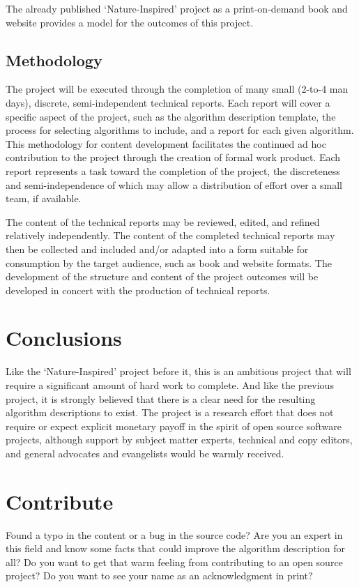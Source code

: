 \documentclass[a4paper, 11pt]{article}
\begin{document}
The already published `Nature-Inspired' project as a print-on-demand book and website provides a model for the outcomes of this project.

\subsection{Methodology}
The project will be executed through the completion of many small (2-to-4 man days), discrete, semi-independent technical reports. Each report will cover a specific aspect of the project, such as the algorithm description template, the process for selecting algorithms to include, and a report for each given algorithm. This methodology for content development facilitates the continued ad hoc contribution to the project through the creation of formal work product. Each report represents a task toward the completion of the project, the discreteness and semi-independence of which may allow a distribution of effort over a small team, if available.

The content of the technical reports may be reviewed, edited, and refined relatively independently. The content of the completed technical reports may then be collected and included and/or adapted into a form suitable for consumption by the target audience, such as book and website formats. The development of the structure and content of the project outcomes will be developed in concert with the production of technical reports.

\section{Conclusions}
\label{sec:conclusions}
Like the `Nature-Inspired' project before it, this is an ambitious project that will require a significant amount of hard work to complete. And like the previous project, it is strongly believed that there is a clear need for the resulting algorithm descriptions to exist. 
The project is a research effort that does not require or expect explicit monetary payoff in the spirit of open source software projects, although support by subject matter experts, technical and copy editors, and general advocates and evangelists would be warmly received. 

% 
% 
\section{Contribute}
\label{sec:contribute}
Found a typo in the content or a bug in the source code? 
Are you an expert in this field and know some facts that could improve the algorithm description for all?
Do you want to get that warm feeling from contributing to an open source project? 
Do you want to see your name as an acknowledgment in print?
\end{document}
